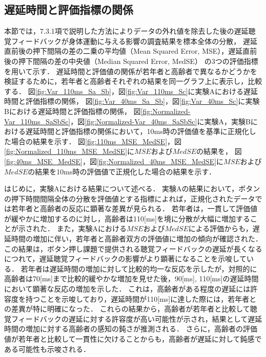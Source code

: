\subsection{遅延時間と評価指標の関係}
本節では，7.3.1項で説明した方法によりデータの外れ値を除去した後の遅延聴覚フィードバックが身体運動に与える影響の調査結果を標本全体の分散，
遅延直前後の押下間隔の差の二乗の平均値（Mean Squared Error, MSE），遅延直前後の押下間隔の差の中央値（Median Squared Error, MedSE）
の3つの評価指標を用いて示す．
遅延時間と評価値の関係が若年者と高齢者で異なるかどうかを検証するために，若年者と高齢者それぞれの結果を同一グラフ上に表示し，比較する．
図\ref{fig:Var_110ms_Sa_Sb}，図\ref{fig:Var_110ms_Sc}に実験Aにおける遅延時間と評価指標の関係，
図\ref{fig:Var_40ms_Sa_Sb}，図\ref{fig:Var_40ms_Sc}に実験Bにおける遅延時間と評価指標の関係，
図\ref{fig:Normalized-Var_110ms_SaSbSc}，図\ref{fig:Normalized-Var_40ms_SaSbSc}に実験A，実験Bにおける遅延時間と評価指標の関係において，10ms時の評価値を基準に正規化した場合の結果を示す．
図\ref{fig:110ms_MSE_MedSE}，図\ref{fig:Normalized_110ms_MSE_MedSE}に$MSE$および$MedSE$の結果を，
図\ref{fig:40ms_MSE_MedSE}，図\ref{fig:Normalized_40ms_MSE_MedSE}に$MSE$および$MedSE$の結果を10ms時の評価値で正規化した場合の結果を示す．

はじめに，実験Aにおける結果について述べる．
実験Aの結果において，ボタンの押下時間間隔全体の分散を評価値とする指標によれば，正規化されたデータでは若年者と高齢者の反応に顕著な差異が見られる．
若年者は，一貫して評価値が緩やかに増加するのに対し，高齢者は110[ms]を境に分散が大幅に増加することが示された．
また，実験Aにおける$MSE$および$MedSE$による評価からも，遅延時間の増加に伴い，若年者と高齢者双方の評価値に増加の傾向が確認された．
この結果は，ボタン押し課題で提供される聴覚フィードバックの遅延が長くなるにつれて，遅延聴覚フィードバックの影響がより顕著になることを示唆している．
若年者は遅延時間の増加に対して比較的均一な反応を示したが，対照的に高齢者は70[ms]まで比較的緩やかな増加を見せた後，90[ms], 110[ms]の遅延時間において顕著な反応の増加を示した．
これは，高齢者がある程度の遅延には許容度を持つことを示唆しており，遅延時間が110[ms]に達した際には，若年者との差異が特に明確になった．
これらの結果から，高齢者が若年者と比較して聴覚フィードバックの遅延に対する許容度が高い可能性が示され，結果として遅延時間の増加に対する高齢者の感知の鈍さが推測される．
さらに，高齢者の評価値が若年者と比較して一貫性に欠けることからも，高齢者が遅延に対して鈍感である可能性も示唆される．

